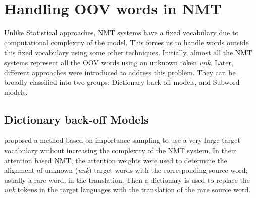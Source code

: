 

%




\section{Handling OOV words in NMT}
Unlike Statistical approaches, NMT systems have a fixed vocabulary due to computational complexity of the model. This forces us to handle words outside this fixed vocabulary using some other techniques. Initially, almost all the NMT systems represent all the OOV words using an unknown token \textit{unk}. Later, different approaches were introduced to address this problem. They can be broadly classified into two groups: Dictionary back-off models, and Subword models.

\subsection{Dictionary back-off Models}

\cite{jean2014using} proposed a method based on importance sampling to use a very large target vocabulary without increasing the complexity of the NMT system. In their attention based NMT, the attention weights were used to determine the alignment of unknown (\textit{unk}) target words with the corresponding source word; usually a rare word, in the translation. Then a dictionary is used to replace the \textit{unk} tokens in the target languages with the translation of the rare source word.

